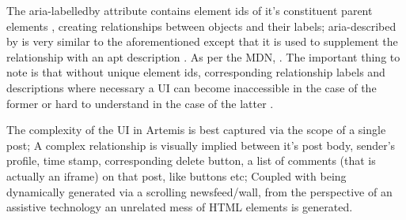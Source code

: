 The aria-labelledby attribute contains element ids of it's constituent parent elements \cite{MozillaDeveloperNetworkb}, creating relationships between objects and their labels; aria-described by is very similar to the aforementioned except that it is used to supplement the relationship with an apt description \cite{MozillaDeveloperNetworkd}. As per the MDN, . The important thing to note is that without unique element id\textquotesingle s, corresponding relationship labels and descriptions where necessary a UI can become inaccessible in the case of the former or  hard to understand in the case of the latter \cite{MozillaDeveloperNetworkb,MozillaDeveloperNetworkd}.

The complexity of the UI in Artemis is best captured via the scope of a  single post; A complex relationship is visually implied between it's post body, sender's profile, time stamp, corresponding delete button, a list of comments (that is actually an iframe) on that post, like buttons etc; Coupled with being dynamically generated via a scrolling newsfeed/wall, from the perspective of an assistive technology an unrelated mess of HTML elements is generated.





